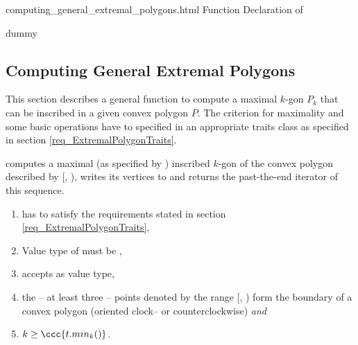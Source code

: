 \begin{ccAdvanced}
  \ccHtmlNoClassToc
  \begin{ccHtmlClassFile}{computing_general_extremal_polygons.html}
    {Function Declaration of }
    \ccHtmlNoClassIndex\ccHtmlNoClassLinks
    \begin{ccClass}{dummy}
      \ccHtmlNoIndex\subsection{Computing General Extremal
        Polygons}\label{secGeneralExtremalPolygons}
    \end{ccClass}
    
    This section describes a general function to compute a maximal
    $k$-gon $P_k$ that can be inscribed in a given convex polygon $P$.
    The criterion for maximality and some basic operations have to
    specified in an appropriate traits class as specified in section
    \ref{req_ExtremalPolygonTraits}.
    

    \def\ccLongParamLayout{\ccTrue} 
    
    
    computes a maximal (as specified by ) inscribed $k$-gon of
    the convex polygon described by [,
    ), writes its vertices to  and returns the
    past-the-end iterator of this sequence.
    
    \begin{enumerate}
    \item {} has to satisfy the requirements stated in section
      \ref{req_ExtremalPolygonTraits},
    \item Value type of  must be
      ,
    \item {} accepts  as value
      type,
    \item the -- at least three -- points denoted by the range
      [, ) form the boundary of a
      convex polygon (oriented clock-- or counterclockwise) \textit{and}
    \item $k \ge \ccc{t.min_k()}$.
    \end{enumerate}
    

\end{ccHtmlClassFile}
\end{ccAdvanced}
